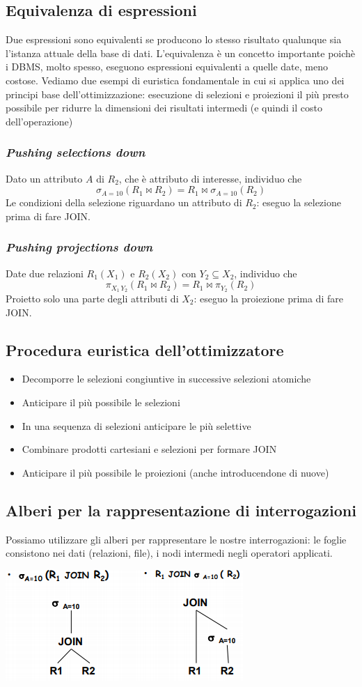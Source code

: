 \subsection{Equivalenza di espressioni}
Due espressioni sono equivalenti se producono lo stesso risultato qualunque sia l'istanza attuale della base di dati. L'equivalenza è un concetto importante poichè i DBMS, molto spesso, eseguono espressioni equivalenti a quelle date, meno costose. Vediamo due esempi di euristica fondamentale in cui si applica uno dei principi base dell'ottimizzazione: esecuzione di selezioni e proiezioni il più presto possibile per ridurre la dimensioni dei risultati intermedi (e quindi il costo dell'operazione)
\subsubsection{\emph{Pushing selections down}}
Dato un attributo $A$ di $R_2$, che è attributo di interesse, individuo che
\[\sigma_{A=10}(R_1 \Join R_2)=R_1 \Join \sigma_{A=10}(R_2)\]
Le condizioni della selezione riguardano un attributo di $R_2$: eseguo la selezione prima di fare JOIN.
\subsubsection{\emph{Pushing projections down}}
Date due relazioni $R_1(X_1)$ e $R_2(X_2)$ con $Y_2 \subseteq X_2$, individuo che
\[\pi_{X_1\,Y_2}(R_1 \Join R_2)=R_1 \Join \pi_{Y_2}(R_2)\]
Proietto solo una parte degli attributi di $X_2$: eseguo la proiezione prima di fare JOIN.
\subsection{Procedura euristica dell'ottimizzatore}
\begin{itemize}
	\item Decomporre le selezioni congiuntive in successive selezioni atomiche
	\item Anticipare il più possibile le selezioni
	\item In una sequenza di selezioni anticipare le più selettive
	\item Combinare prodotti cartesiani e selezioni per formare JOIN
	\item Anticipare il più possibile le proiezioni (anche introducendone di nuove)
\end{itemize}
\subsection{Alberi per la rappresentazione di interrogazioni}
Possiamo utilizzare gli alberi per rappresentare le nostre interrogazioni: le foglie consistono nei dati (relazioni, file), i nodi intermedi negli operatori applicati.
\begin{center}
	\includegraphics{images/48.PNG}
\end{center}